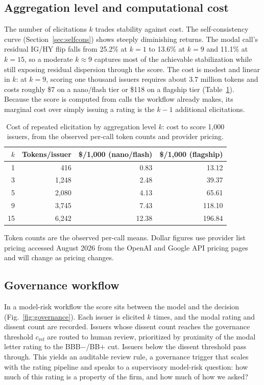 \documentclass[a4paper,fleqn]{cas-sc}
\begin{document}
\subsection{Aggregation level and computational cost}\label{sec:sis-cost}
The number of elicitations $k$ trades stability against cost. The self-consistency curve
(Section~\ref{sec:selfcons}) shows steeply diminishing returns. The modal call's residual IG/HY flip
falls from 25.2\% at $k=1$ to 13.6\% at $k=9$ and 11.1\% at $k=15$, so a moderate $k\!\approx\!9$ captures
most of the achievable stabilization while still exposing residual dispersion through the score. The cost
is modest and linear in $k$: at $k=9$, scoring one thousand issuers requires about $3.7$ million tokens
and costs roughly \$7 on a nano/flash tier or \$118 on a flagship tier (Table~\ref{tab:cost}). Because the
score is computed from calls the workflow already makes, its marginal cost over simply issuing a rating is
the $k-1$ additional elicitations.

\begin{table}[t]\centering
\caption{Cost of repeated elicitation by aggregation level $k$: cost to score
1{,}000 issuers, from the observed per-call token counts and provider pricing.}\label{tab:cost}
\begin{tabular}{rrrr}\toprule
$k$ & Tokens/issuer & \$/1{,}000 (nano/flash) & \$/1{,}000 (flagship) \\\midrule
1 & 416 & 0.83 & 13.12 \\
3 & 1{,}248 & 2.48 & 39.37 \\
5 & 2{,}080 & 4.13 & 65.61 \\
9 & 3{,}745 & 7.43 & 118.10 \\
15 & 6{,}242 & 12.38 & 196.84 \\\bottomrule
\end{tabular}

\vspace{3pt}
{\footnotesize\raggedright Token counts are the observed per-call means. Dollar figures use provider list
pricing accessed August 2026 from the OpenAI and Google API pricing pages and will change as pricing
changes.\par}
\end{table}

\subsection{Governance workflow}\label{sec:sis-gov}
In a model-risk workflow the score sits between the model and the decision (Fig.~\ref{fig:governance}).
Each issuer is elicited $k$ times, and the modal rating and dissent count are recorded. Issuers
whose dissent count reaches the governance threshold $c_{\mathrm{ref}}$ are routed to human review,
prioritized by proximity of the modal letter rating to the BBB$-$/BB$+$ cut. Issuers below the
dissent threshold pass through. This yields an auditable review rule, a
governance trigger that scales with the rating pipeline and speaks to a supervisory model-risk question:
how much of this rating is a property of the firm, and how much of how we asked?
\end{document}
